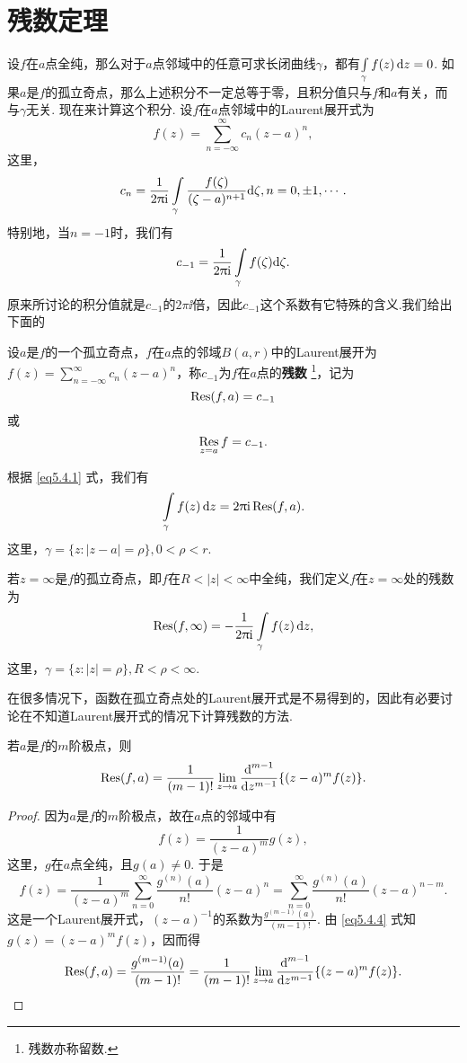 \section{残数定理\label{sec5.4}}
设$f$在$a$点全纯，那么对于$a$点邻域中的任意可求长闭曲线$\gamma$，都有$\int\limits_\gamma f(z)\mathop{}\!\mathrm dz=0$. 如果$a$是$f$的孤立奇点，那么上述积分不一定总等于零，且积分值只与$f$和$a$有关，而与$\gamma$无关. 现在来计算这个积分. 设$f$在$a$点邻域中的Laurent展开式为
\[f(z)=\sum_{n=-\infty}^\infty c_n(z-a)^n,\]
这里，
\[c_n=\frac1{2\uppi\mathrm i}\int\limits_{\gamma}\frac{f(\zeta)}{(\zeta-a)^{n+1}}\textrm d\zeta,n=0,\pm1,\cdots.\]
特别地，当$n=-1$时，我们有
\begin{equation}\label{eq5.4.1}
c_{-1}=\frac1{2\uppi\mathrm i}\int\limits_{\gamma}f(\zeta)\textrm d\zeta.
\end{equation}
原来所讨论的积分值就是$c_{-1}$的$2\pi\ii$倍，因此$c_{-1}$这个系数有它特殊的含义.我们给出下面的
\begin{definition}\label{def5.4.1}
设$a$是$f$的一个孤立奇点，$f$在$a$点的邻域$B(a,r)$中的Laurent展开为$f(z)=\sum_{n=-\infty}^\infty c_n(z-a)^n$，称$c_{-1}$为$f$在$a$点的\textbf{残数}
\footnote{残数亦称留数.}，记为
\[\operatorname*{Res}(f,a)=c_{-1}\]
或
\[\operatorname*{Res}_{z=a}f=c_{-1}.\]
\end{definition}

根据 \eqref{eq5.4.1} 式，我们有
\begin{equation}\label{eq5.4.2}
\int\limits_\gamma f(z)\mathop{}\!\mathrm dz=2\uppi\mathrm i\operatorname*{Res}(f,a).
\end{equation}
这里，$\gamma=\{z:|z-a|=\rho\},0<\rho<r$.

若$z=\infty$是$f$的孤立奇点，即$f$在$R<|z|<\infty$中全纯，我们定义$f$在$z=\infty$处的残数为
\begin{equation}\label{eq5.4.3}
\operatorname*{Res}(f,\infty)=-\frac1{2\uppi\mathrm i}\int\limits_\gamma f(z)\mathop{}\!\mathrm dz,
\end{equation}
这里，$\gamma=\{z:|z|=\rho\},R<\rho<\infty$.

在很多情况下，函数在孤立奇点处的Laurent展开式是不易得到的，因此有必要讨论在不知道Laurent展开式的情况下计算残数的方法.

\begin{prop}\label{prop5.4.2}
若$a$是$f$的$m$阶极点，则
\[\operatorname*{Res}(f,a)=\frac1{(m-1)!}\lim_{z\to a}\frac{\textrm d^{m-1}}{\textrm dz^{m-1}}
\{(z-a)^mf(z)\}.\]
\end{prop}
\begin{proof}
因为$a$是$f$的$m$阶极点，故在$a$点的邻域中有
\begin{equation}\label{eq5.4.4}
f(z)=\frac1{(z-a)^m}g(z),
\end{equation}
这里，$g$在$a$点全纯，且$g(a)\ne0$. 于是
\[f(z)=\frac1{(z-a)^m}\sum_{n=0}^\infty\frac{g^{(n)}(a)}{n!}(z-a)^n
=\sum_{n=0}^\infty\frac{g^{(n)}(a)}{n!}(z-a)^{n-m}.\]
这是一个Laurent展开式，$(z-a)^{-1}$的系数为$\frac{g^{(m-1)}(a)}{(m-1)!}$. 由 \eqref{eq5.4.4} 式知$g(z)=(z-a)^mf(z)$，因而得
\begin{equation*}
\operatorname*{Res}(f,a)=\frac{g^{(m-1)}(a)}{(m-1)!}=\frac1{(m-1)!}\lim_{z\to a}\frac{\textrm d^{m-1}}{\textrm dz^{m-1}}\{(z-a)^mf(z)\}.
\end{equation*}
\end{proof}

